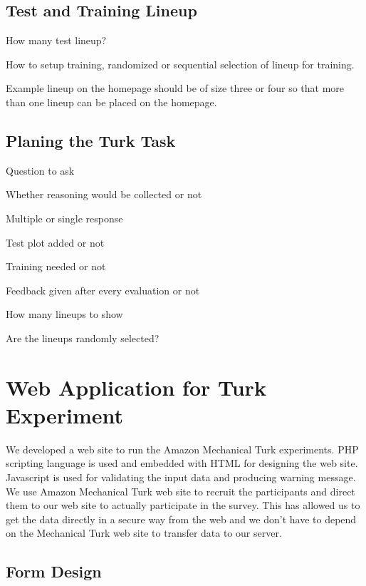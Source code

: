 \documentclass[11pt]{article}
\begin{document}
\subsection{Test and Training Lineup} How many test lineup?

How to setup training, randomized or sequential selection of lineup for training.

Example lineup on the homepage should be of size three or four so that more than one lineup can be placed on the homepage.

\subsection{Planing the Turk Task}
Question to ask

Whether reasoning would be collected or not

Multiple or single response

Test plot added or not

Training needed or not

Feedback given after every evaluation or not

How many lineups to show

Are the lineups randomly selected?

 


\section{Web Application for Turk Experiment} We developed a web site to run the Amazon Mechanical Turk experiments.  PHP scripting language is used and embedded with HTML for designing the web site. Javascript is used for validating the input data and producing warning message.  We use  Amazon Mechanical Turk web site to recruit the participants and direct them to our web site to actually participate in the survey. This has allowed us to get the data directly in a secure way from the web and we don't have to depend on the Mechanical Turk web site to transfer data to our server. 

\subsection{Form Design}
\end{document}
